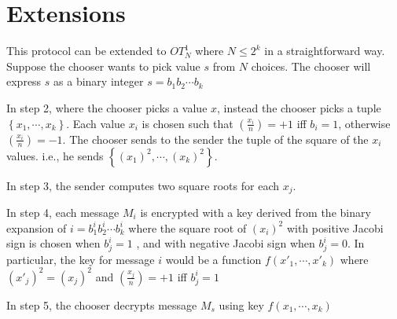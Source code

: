 \section{Extensions}

This protocol can be extended to $OT_{N}^{1}$ where $N\le2^{k}$
in a straightforward way. Suppose the chooser wants to pick value
$s$ from $N$ choices. The chooser will express $s$ as a binary
integer $s=b_{1}b_{2}\cdots b_{k}$

In step 2, where the chooser picks a value $x$, instead the chooser
picks a tuple $\left\{ x_{1},\cdots,x_{k}\right\} $. Each value $x_{i}$
is chosen such that $\left(\frac{x_{i}}{n}\right)=+1$ iff $b_{i}=1$,
otherwise $\left(\frac{x_{i}}{n}\right)=-1$. The chooser sends to
the sender the tuple of the square of the $x_{i}$ values. i.e., he
sends $\left\{ \left(x_{1}\right)^{2},\cdots,\left(x_{k}\right)^{2}\right\} $.

In step 3, the sender computes two square roots for each $x_{j}$.

In step 4, each message $M_{i}$ is encrypted with a key derived from
the binary expansion of $i=b_{1}^{i}b_{2}^{i}\cdots b_{k}^{i}$ where
the square root of $\left(x_{i}\right)^{2}$ with positive Jacobi
sign is chosen when $b_{j}^{i}=1$ , and with negative Jacobi sign
when $b_{j}^{i}=0$. In particular, the key for message $i$ would
be a function $f(x'_{1},\cdots,x'_{k})$ where $\left(x'_{j}\right)^{2}=\left(x_{j}\right)^{2}$
and $\left(\frac{x_{j}}{n}\right)=+1$ iff $b_{j}^{i}=1$

In step 5, the chooser decrypts message $M_{s}$ using key $f(x_{1},\cdots,x_{k})$

\begin{comment}
 

\end{comment}
